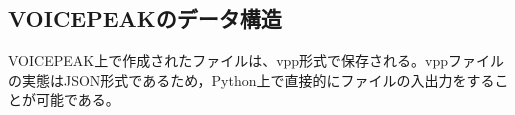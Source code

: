 \subsection{VOICEPEAKのデータ構造}
VOICEPEAK上で作成されたファイルは、vpp形式で保存される。vppファイルの実態はJSON形式であるため，Python上で直接的にファイルの入出力をすることが可能である。

% 
%






